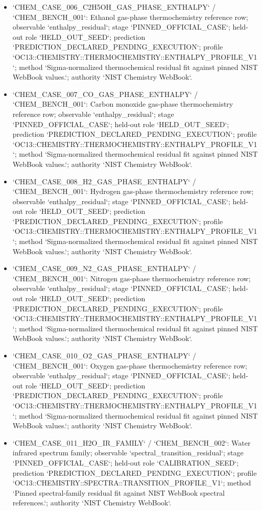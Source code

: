 \begin{itemize}
\item `CHEM\_CASE\_006\_C2H5OH\_GAS\_PHASE\_ENTHALPY` / `CHEM\_BENCH\_001`: Ethanol gas-phase thermochemistry reference row; observable `enthalpy\_residual`; stage `PINNED\_OFFICIAL\_CASE`; held-out role `HELD\_OUT\_SEED`; prediction `PREDICTION\_DECLARED\_PENDING\_EXECUTION`; profile `OC13::CHEMISTRY::THERMOCHEMISTRY::ENTHALPY\_PROFILE\_V1`; method `Sigma-normalized thermochemical residual fit against pinned NIST WebBook values.`; authority `NIST Chemistry WebBook`.
\item `CHEM\_CASE\_007\_CO\_GAS\_PHASE\_ENTHALPY` / `CHEM\_BENCH\_001`: Carbon monoxide gas-phase thermochemistry reference row; observable `enthalpy\_residual`; stage `PINNED\_OFFICIAL\_CASE`; held-out role `HELD\_OUT\_SEED`; prediction `PREDICTION\_DECLARED\_PENDING\_EXECUTION`; profile `OC13::CHEMISTRY::THERMOCHEMISTRY::ENTHALPY\_PROFILE\_V1`; method `Sigma-normalized thermochemical residual fit against pinned NIST WebBook values.`; authority `NIST Chemistry WebBook`.
\item `CHEM\_CASE\_008\_H2\_GAS\_PHASE\_ENTHALPY` / `CHEM\_BENCH\_001`: Hydrogen gas-phase thermochemistry reference row; observable `enthalpy\_residual`; stage `PINNED\_OFFICIAL\_CASE`; held-out role `HELD\_OUT\_SEED`; prediction `PREDICTION\_DECLARED\_PENDING\_EXECUTION`; profile `OC13::CHEMISTRY::THERMOCHEMISTRY::ENTHALPY\_PROFILE\_V1`; method `Sigma-normalized thermochemical residual fit against pinned NIST WebBook values.`; authority `NIST Chemistry WebBook`.
\item `CHEM\_CASE\_009\_N2\_GAS\_PHASE\_ENTHALPY` / `CHEM\_BENCH\_001`: Nitrogen gas-phase thermochemistry reference row; observable `enthalpy\_residual`; stage `PINNED\_OFFICIAL\_CASE`; held-out role `HELD\_OUT\_SEED`; prediction `PREDICTION\_DECLARED\_PENDING\_EXECUTION`; profile `OC13::CHEMISTRY::THERMOCHEMISTRY::ENTHALPY\_PROFILE\_V1`; method `Sigma-normalized thermochemical residual fit against pinned NIST WebBook values.`; authority `NIST Chemistry WebBook`.
\item `CHEM\_CASE\_010\_O2\_GAS\_PHASE\_ENTHALPY` / `CHEM\_BENCH\_001`: Oxygen gas-phase thermochemistry reference row; observable `enthalpy\_residual`; stage `PINNED\_OFFICIAL\_CASE`; held-out role `HELD\_OUT\_SEED`; prediction `PREDICTION\_DECLARED\_PENDING\_EXECUTION`; profile `OC13::CHEMISTRY::THERMOCHEMISTRY::ENTHALPY\_PROFILE\_V1`; method `Sigma-normalized thermochemical residual fit against pinned NIST WebBook values.`; authority `NIST Chemistry WebBook`.
\item `CHEM\_CASE\_011\_H2O\_IR\_FAMILY` / `CHEM\_BENCH\_002`: Water infrared spectrum family; observable `spectral\_transition\_residual`; stage `PINNED\_OFFICIAL\_CASE`; held-out role `CALIBRATION\_SEED`; prediction `PREDICTION\_DECLARED\_PENDING\_EXECUTION`; profile `OC13::CHEMISTRY::SPECTRA::TRANSITION\_PROFILE\_V1`; method `Pinned spectral-family residual fit against NIST WebBook spectral references.`; authority `NIST Chemistry WebBook`.

\end{itemize}
